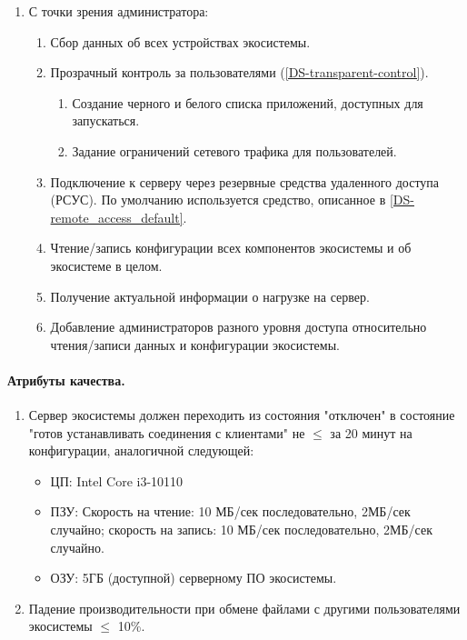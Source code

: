\begin{enumerate}[label={\bfseries ПТ-\arabic*.}]
   \item С точки зрения администратора:
         \begin{enumerate}[nosep,label*={\bfseries\arabic*.}]
            \item Сбор данных об всех устройствах экосистемы.
            \item Прозрачный контроль за пользователями (\ref{DS-transparent-control}).
                  \begin{enumerate}[nosep,label*={\bfseries\arabic*.}]
                     \item Создание черного и белого списка приложений, доступных для запускаться.
                     \item Задание ограничений сетевого трафика для пользователей.
                  \end{enumerate}
            \item Подключение к серверу через резервные средства удаленного доступа (РСУС). По умолчанию используется средство, описанное в \ref{DS-remote_access_default}.
            \item Чтение/запись конфигурации всех компонентов экосистемы и об экосистеме в целом.
            \item Получение актуальной информации о нагрузке на сервер.
            \item Добавление администраторов разного уровня доступа относительно чтения/записи данных и конфигурации экосистемы.
         \end{enumerate}
\end{enumerate}

\paragraph{Атрибуты качества.}
\begin{enumerate}[label={\bfseries АК-\arabic*.}]

   \item Сервер экосистемы должен переходить из состояния "отключен" в состояние "готов устанавливать соединения с клиентами" не \(\leq\) за 20 минут на конфигурации, аналогичной следующей:
         \begin{itemize}[label=---]
            \item ЦП: Intel Core i3-10110
            \item ПЗУ: Скорость на чтение: 10 МБ/сек последовательно, 2МБ/сек случайно; скорость на запись: 10 МБ/сек последовательно, 2МБ/сек случайно.
            \item ОЗУ: 5ГБ (доступной) серверному ПО экосистемы.
         \end{itemize}
   \item Падение производительности при обмене файлами с другими пользователями экосистемы \(\leq\) 10\%.
\end{enumerate}

